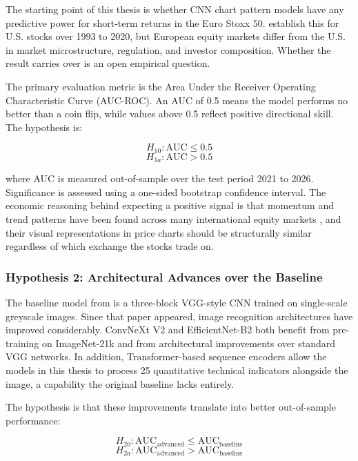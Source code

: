 The starting point of this thesis is whether CNN chart pattern models have any predictive power for short-term returns in the Euro Stoxx 50. \textcite{Jiang2023} establish this for U.S. stocks over 1993 to 2020, but European equity markets differ from the U.S. in market microstructure, regulation, and investor composition. Whether the result carries over is an open empirical question.

The primary evaluation metric is the Area Under the Receiver Operating Characteristic Curve (AUC-ROC). An AUC of 0.5 means the model performs no better than a coin flip, while values above 0.5 reflect positive directional skill. The hypothesis is:

\begin{equation}
  H_{10}: \text{AUC} \leq 0.5
\end{equation}
\begin{equation}
  H_{1a}: \text{AUC} > 0.5
\end{equation}

where AUC is measured out-of-sample over the test period 2021 to 2026. Significance is assessed using a one-sided bootstrap confidence interval. The economic reasoning behind expecting a positive signal is that momentum and trend patterns have been found across many international equity markets \parencite{Jegadeesh1993}, and their visual representations in price charts should be structurally similar regardless of which exchange the stocks trade on.

\subsubsection*{Hypothesis 2: Architectural Advances over the Baseline}

The baseline model from \textcite{Jiang2023} is a three-block VGG-style CNN trained on single-scale greyscale images. Since that paper appeared, image recognition architectures have improved considerably. ConvNeXt V2 \parencite{liu2022convnext} and EfficientNet-B2 both benefit from pre-training on ImageNet-21k and from architectural improvements over standard VGG networks. In addition, Transformer-based sequence encoders \parencite{vaswani2017} allow the models in this thesis to process 25 quantitative technical indicators alongside the image, a capability the original baseline lacks entirely.

The hypothesis is that these improvements translate into better out-of-sample performance:

\begin{equation}
  H_{20}: \text{AUC}_{\text{advanced}} \leq \text{AUC}_{\text{baseline}}
\end{equation}
\begin{equation}
  H_{2a}: \text{AUC}_{\text{advanced}} > \text{AUC}_{\text{baseline}}
\end{equation}

